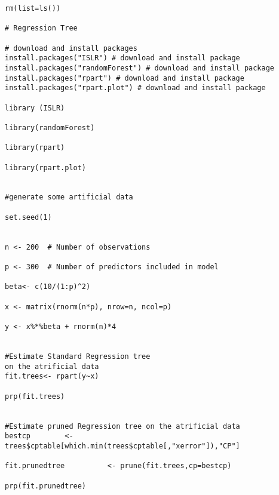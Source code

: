 \documentclass[12pt]{article}
\begin{document}
\begin{lstlisting}[title=\textbf{Standard Regression Tree}]
rm(list=ls())

# Regression Tree

# download and install packages
install.packages("ISLR") # download and install package
install.packages("randomForest") # download and install package
install.packages("rpart") # download and install package
install.packages("rpart.plot") # download and install package

library (ISLR)

library(randomForest)

library(rpart)

library(rpart.plot)


#generate some artificial data

set.seed(1)


n <- 200  # Number of observations

p <- 300  # Number of predictors included in model

beta<- c(10/(1:p)^2)

x <- matrix(rnorm(n*p), nrow=n, ncol=p)

y <- x%*%beta + rnorm(n)*4


#Estimate Standard Regression tree
on the atrificial data
fit.trees<- rpart(y~x)

prp(fit.trees)


#Estimate pruned Regression tree on the atrificial data
bestcp        <- trees$cptable[which.min(trees$cptable[,"xerror"]),"CP"]

fit.prunedtree          <- prune(fit.trees,cp=bestcp)

prp(fit.prunedtree)


\end{lstlisting}
\end{document}
